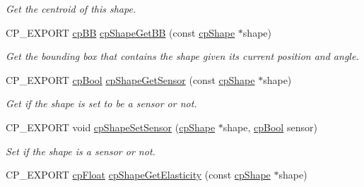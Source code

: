 \begin{DoxyCompactItemize}
\begin{DoxyCompactList}\small\item\em Get the centroid of this shape. \end{DoxyCompactList}\item 
\mbox{\label{group__cp_shape_ga2e90f99cd96ca0b17b8fe9a41d9db96a}} 
C\+P\+\_\+\+E\+X\+P\+O\+RT \mbox{\hyperlink{structcp_b_b}{cp\+BB}} \mbox{\hyperlink{group__cp_shape_ga2e90f99cd96ca0b17b8fe9a41d9db96a}{cp\+Shape\+Get\+BB}} (const \mbox{\hyperlink{structcp_shape}{cp\+Shape}} $\ast$shape)
\begin{DoxyCompactList}\small\item\em Get the bounding box that contains the shape given it\textquotesingle{}s current position and angle. \end{DoxyCompactList}\item 
\mbox{\label{group__cp_shape_ga02d5d24afa5c5fbe529d3a1ff3bfb85d}} 
C\+P\+\_\+\+E\+X\+P\+O\+RT \mbox{\hyperlink{group__basic_types_gabc5e752c48f3449ca26ef413ecbd647e}{cp\+Bool}} \mbox{\hyperlink{group__cp_shape_ga02d5d24afa5c5fbe529d3a1ff3bfb85d}{cp\+Shape\+Get\+Sensor}} (const \mbox{\hyperlink{structcp_shape}{cp\+Shape}} $\ast$shape)
\begin{DoxyCompactList}\small\item\em Get if the shape is set to be a sensor or not. \end{DoxyCompactList}\item 
\mbox{\label{group__cp_shape_gad82e18c0a765300e42108c88caa3bbbb}} 
C\+P\+\_\+\+E\+X\+P\+O\+RT void \mbox{\hyperlink{group__cp_shape_gad82e18c0a765300e42108c88caa3bbbb}{cp\+Shape\+Set\+Sensor}} (\mbox{\hyperlink{structcp_shape}{cp\+Shape}} $\ast$shape, \mbox{\hyperlink{group__basic_types_gabc5e752c48f3449ca26ef413ecbd647e}{cp\+Bool}} sensor)
\begin{DoxyCompactList}\small\item\em Set if the shape is a sensor or not. \end{DoxyCompactList}\item 
\mbox{\label{group__cp_shape_ga2aca093a208084722c943a092f9735cb}} 
C\+P\+\_\+\+E\+X\+P\+O\+RT \mbox{\hyperlink{group__basic_types_gac1ed65573e035bf892505768c852d8d3}{cp\+Float}} \mbox{\hyperlink{group__cp_shape_ga2aca093a208084722c943a092f9735cb}{cp\+Shape\+Get\+Elasticity}} (const \mbox{\hyperlink{structcp_shape}{cp\+Shape}} $\ast$shape)

\end{DoxyCompactItemize}
